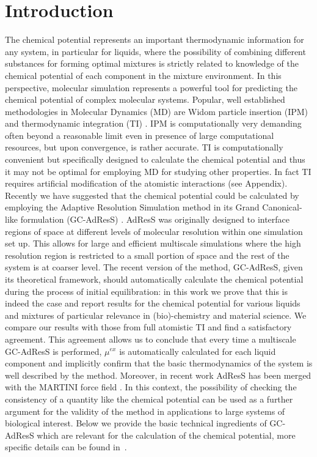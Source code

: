 \documentclass[a4paper,preprint,unsortedaddress]{revtex4-1}
\newcommand{\recheck}[1]{{\color{red} #1}}
\begin{document}
\section{Introduction}
The chemical potential represents an important thermodynamic information for any system, in particular for liquids, where the possibility of combining different substances for forming optimal mixtures is strictly related to knowledge of the chemical potential of each component in the mixture environment. In this perspective, molecular simulation represents a powerful tool for predicting the chemical potential of complex molecular systems. Popular, well established methodologies in Molecular Dynamics (MD) are Widom particle insertion (IPM) \cite{widom} and thermodynamic integration (TI) \cite{ti}. IPM is computationally very demanding often beyond a reasonable limit even in presence of large computational resources, but upon convergence, is rather accurate. TI is computationally convenient but specifically designed to calculate the chemical potential and thus  it may not be optimal for employing MD for studying other properties. In fact TI requires artificial modification of the atomistic interactions (see Appendix).
Recently we have suggested that the chemical potential could be calculated by employing the Adaptive Resolution Simulation method in its Grand Canonical-like formulation (GC-AdResS) \cite{prl12,jctchan,prx}.
AdResS was originally designed  to interface regions of space at different levels of molecular resolution within one simulation set up. This allows for large and efficient multiscale simulations where the high resolution region is restricted to a small portion of space and the rest of the system is at coarser level. The recent version of the method, GC-AdResS, given its theoretical framework, should automatically calculate the chemical potential during the process of initial equilibration: in this work we prove that this is indeed the case and report results for the chemical potential for various liquids and mixtures of particular relevance in (bio)-chemistry and material science. We compare our results with those from full atomistic TI and find a satisfactory agreement. This agreement allows us to conclude that every time a multiscale GC-AdResS is performed, $\mu^{ex}$ is automatically calculated for each liquid component and implicitly confirm that the basic thermodynamics of the system is well described by the method.
\recheck{Moreover, in recent work AdResS has been merged with the MARTINI force field \cite{matej-sw1,matej-sw2}. In this context, the possibility of checking the consistency of a quantity like the chemical potential can be used as a further argument for the validity of the method in applications to large systems of biological interest.}
Below we provide the basic technical ingredients of GC-AdResS which are relevant for the calculation of the chemical potential, more specific details can be found in~\cite{jctchan, prx}.
\end{document}
